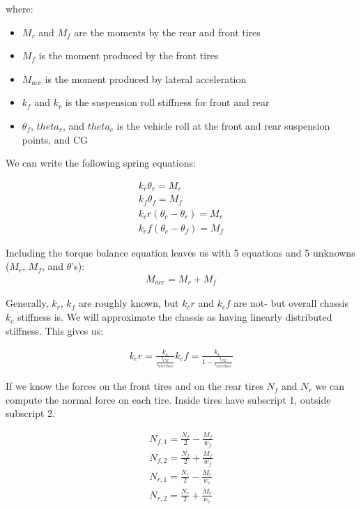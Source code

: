 \documentclass{article}
\begin{document}
where:
\begin{itemize}
\item $M_r$ and $M_f$ are the moments by the rear and front tires
\item $M_f$ is the moment produced by the front tires
\item $M_{acc}$ is the moment produced by lateral acceleration
\item $k_f$ and $k_r$ is the suspension roll stiffness for front and rear
\item $\theta_f$, $theta_r$, and $theta_c$ is the vehicle roll at the front and rear suspension points, and CG
\end{itemize}

We can write the following spring equations:

\begin{align}
	k_r \theta_r = M_r \\
	k_f \theta_f = M_f \\
	k_cr (\theta_c-\theta_r) = M_r \\
	k_cf (\theta_c-\theta_f) = M_f
\end{align}

Including the torque balance equation leaves us with 5 equations and 5 unknowns ($M_r$, $M_f$, and $\theta$'s):
\begin{align}
	M_{acc} = M_r + M_f
\end{align}

Generally, $k_r$, $k_f$ are roughly known, but $k_cr$ and $k_cf$ are not- but overall chassis $k_c$ stiffness is. We will approximate the chassis as having linearly distributed stiffness. This gives us:

\begin{align}
	k_cr = \frac{k_c}{\frac{l_{CG}}{l_{wheelbase}}}
	k_cf = \frac{k_c}{1 - \frac{l_{CG}}{l_{wheelbase}}}
\end{align}

If we know the forces on the front tires and on the rear tires $N_f$ and $N_r$ we can compute the normal force on each tire. Inside tires have subscript 1, outside subscript 2.

\begin{align}
	N_{f,1} = \frac{N_{f}}{2} - \frac{M_f}{w_f} \\
	N_{f,2} = \frac{N_{f}}{2} + \frac{M_f}{w_f} \\
	N_{r,1} = \frac{N_{r}}{2} - \frac{M_r}{w_r} \\
	N_{r,2} = \frac{N_{r}}{2} + \frac{M_r}{w_r} \\
\end{align}
\end{document}
